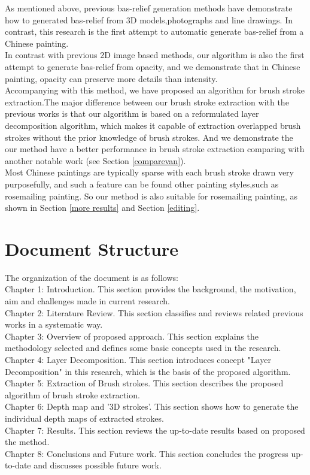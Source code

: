 As mentioned above, previous bas-relief generation methods have demonstrate how to generated bas-relief from 3D models,photographs and line drawings. In contrast, this research is the first attempt to automatic generate bas-relief from a Chinese painting. \\
In contrast with previous 2D image based methods, our algorithm is also the first attempt to generate bas-relief from opacity, and we demonstrate that in Chinese painting, opacity can preserve more details than intensity. \\
Accompanying with this method, we have proposed an algorithm for brush stroke extraction.The major difference between our brush stroke extraction with the previous works is that our algorithm is based on a reformulated layer decomposition algorithm, which makes it capable of extraction overlapped brush strokes without the prior knowledge of brush strokes. And we demonstrate the our method have a better performance in brush stroke extraction comparing with another notable work  \cite{li2012restoration} (see Section  \ref{comparevan}).  \\
Most Chinese paintings are typically sparse with each brush stroke drawn very purposefully\cite{xu2006animating}, and such a feature can be found other painting styles,such as rosemailing painting\cite{smith1997art}. So our method is also suitable for rosemailing painting, as shown in Section \ref{more results} and Section \ref{editing}. 

\section{Document Structure}
The organization of the document is as follows:\\
Chapter 1: Introduction. This section provides the background, the motivation, aim and challenges made in current research.\\
Chapter 2: Literature Review. This section classifies and reviews related previous works in a systematic way.\\
Chapter 3: Overview of proposed approach. This section explains the methodology selected and defines some basic concepts used in the research.\\
Chapter 4: Layer Decomposition. This section introduces concept "Layer Decomposition" in this research, which is the basis of the proposed algorithm.\\
Chapter 5: Extraction of Brush strokes. This section describes the proposed algorithm of brush stroke extraction.\\
Chapter 6: Depth map and '3D strokes'.  This section shows how to generate the individual depth maps of extracted strokes. \\
Chapter 7: Results. This section reviews the up-to-date results based on proposed the method.\\
Chapter 8: Conclusions and Future work. This section concludes the progress up-to-date and discusses possible future work.
\newpage